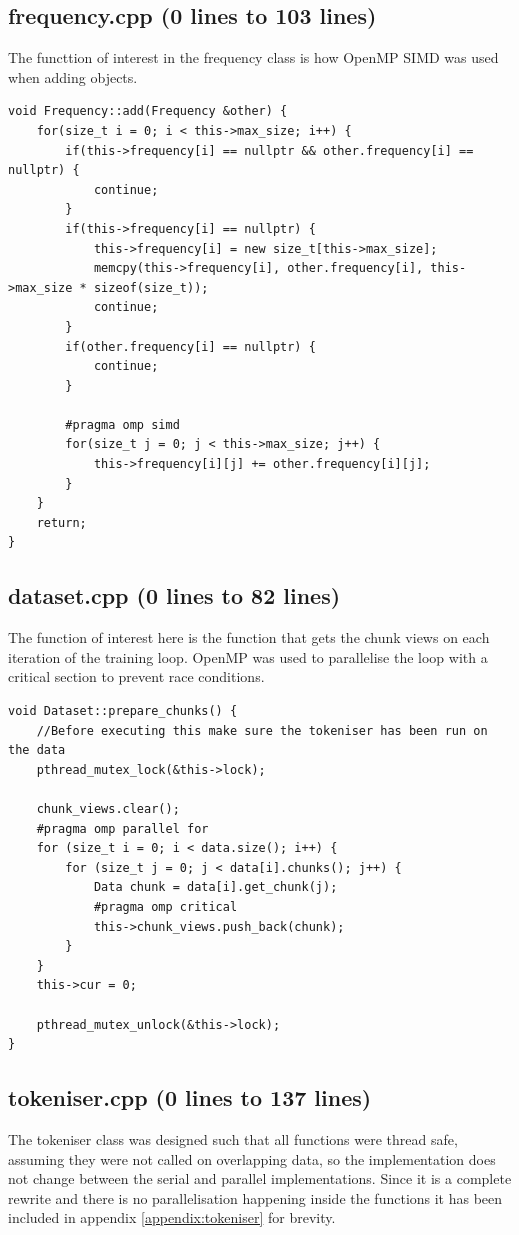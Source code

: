 \documentclass{article}
\begin{document}
\subsection{frequency.cpp (0 lines to 103 lines)}
The functtion of interest in the frequency class is how OpenMP SIMD was used when adding objects.

\begin{verbatim}
void Frequency::add(Frequency &other) {
    for(size_t i = 0; i < this->max_size; i++) {
        if(this->frequency[i] == nullptr && other.frequency[i] == nullptr) {
            continue;
        }
        if(this->frequency[i] == nullptr) {
            this->frequency[i] = new size_t[this->max_size];
            memcpy(this->frequency[i], other.frequency[i], this->max_size * sizeof(size_t));
            continue;
        }
        if(other.frequency[i] == nullptr) {
            continue;
        }

        #pragma omp simd
        for(size_t j = 0; j < this->max_size; j++) {
            this->frequency[i][j] += other.frequency[i][j];
        }
    }
    return;
}
\end{verbatim}


\subsection{dataset.cpp (0 lines to 82 lines)}
The function of interest here is the function that gets the chunk views on each iteration of the training loop.
OpenMP was used to parallelise the loop with a critical section to prevent race conditions.

\begin{verbatim}
void Dataset::prepare_chunks() {
    //Before executing this make sure the tokeniser has been run on the data
    pthread_mutex_lock(&this->lock);

    chunk_views.clear();
    #pragma omp parallel for
    for (size_t i = 0; i < data.size(); i++) {
        for (size_t j = 0; j < data[i].chunks(); j++) {
            Data chunk = data[i].get_chunk(j);
            #pragma omp critical
            this->chunk_views.push_back(chunk);
        }
    }
    this->cur = 0;

    pthread_mutex_unlock(&this->lock);
}
\end{verbatim}


\subsection{tokeniser.cpp (0 lines to 137 lines)}
The tokeniser class was designed such that all functions were thread safe, assuming they were not called on 
overlapping data, so the implementation does not change between the serial and parallel implementations. 
Since it is a complete rewrite and there is no parallelisation happening inside the functions it has been 
included in appendix \ref{appendix:tokeniser} for brevity.
\end{document}
